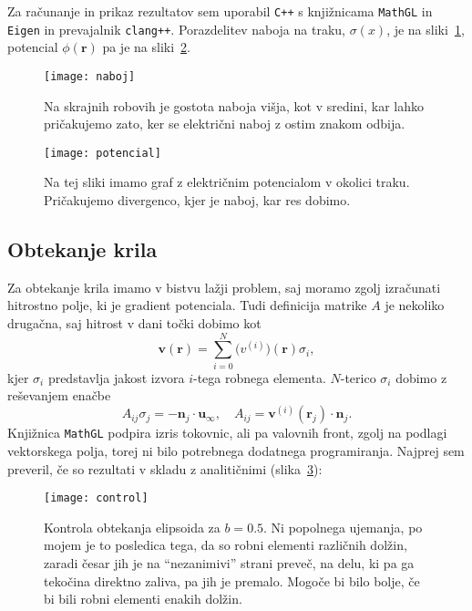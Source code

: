 \documentclass[a4 paper, 12pt]{article}
\renewcommand{\r}{
	\ensuremath{\mathbf{r}}
}
\begin{document}
Za ra\v cunanje in prikaz rezultatov sem uporabil {\tt C++} s knji\v znicama {\tt MathGL} in {\tt Eigen} in
prevajalnik {\tt clang++}. Porazdelitev naboja na traku, $\sigma(x)$, je na sliki~\ref{gr1}, potencial $\phi(\r)$ pa je
na sliki~\ref{gr2}.

\begin{figure}[H]\centering
	\texttt{[image: naboj]}
	\caption{Na skrajnih robovih je gostota naboja vi\v sja, kot v sredini, kar lahko
		pri\v cakujemo zato, ker se elektri\v cni naboj z ostim znakom odbija.}
	\label{gr1}
\end{figure}

\begin{figure}[H]\centering
	\texttt{[image: potencial]}
	\caption{Na tej sliki imamo graf z elektri\v cnim potencialom v okolici traku. Pri\v cakujemo
		divergenco, kjer je naboj, kar res dobimo.}
	\label{gr2}
\end{figure}

\subsection{Obtekanje krila}

Za obtekanje krila imamo v bistvu la\v zji problem, saj moramo zgolj izra\v cunati hitrostno polje, ki je
gradient potenciala. Tudi definicija matrike $A$ je nekoliko druga\v cna, saj hitrost v dani to\v cki
dobimo kot
\[
	\mathbf{v}(\r) = \sum_{i = 0}^N \mathbf(v^{(i)})(\r) \sigma_i,
\]
kjer $\sigma_i$ predstavlja jakost izvora $i$-tega robnega elementa. $N$-terico $\sigma_i$ dobimo z
re\v sevanjem ena\v cbe
\[
	A_{ij}\sigma_j = -\mathbf{n}_j \cdot \mathbf{u}_{\infty}, \quad A_{ij} = \mathbf{v}^{(i)}(\r_j)
		\cdot \mathbf{n}_j.
\]
Knji\v znica {\tt MathGL} podpira izris tokovnic, ali pa valovnih front, zgolj na podlagi vektorskega polja, torej
ni bilo potrebnega dodatnega programiranja. Najprej sem preveril, \v ce so rezultati v skladu z analiti\v cnimi
(slika~\ref{gr2.1}):

\begin{figure}[H]\centering
	\texttt{[image: control]}
	\caption{Kontrola obtekanja elipsoida za $b = 0.5$. Ni popolnega ujemanja, po mojem je to posledica tega,
		da so robni elementi razli\v cnih dol\v zin, zaradi \v cesar jih je na "`nezanimivi"' strani preve\v c,
		na delu, ki pa ga teko\v cina direktno zaliva, pa jih je premalo. Mogo\v ce bi bilo bolje, \v ce bi bili
		robni elementi enakih dol\v zin.}
	\label{gr2.1}
\end{figure}
\end{document}
